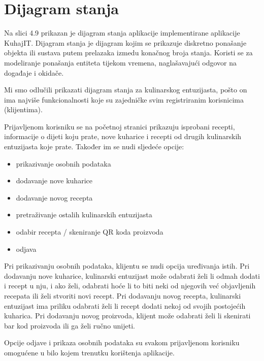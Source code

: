 		\eject
		
		
		\section{Dijagram stanja}
		
		Na slici 4.9 prikazan je dijagram stanja aplikacije implementirane aplikacije KuhajIT. Dijagram stanja je dijagram kojim se prikazuje diskretno ponašanje objekta ili sustava putem prelazaka izmedu konačnog broja stanja. Koristi se za modeliranje ponašanja entiteta tijekom vremena, naglašavajući odgovor na događaje i okidače.
		
		Mi smo odlučili prikazati dijagram stanja za kulinarskog entuzijasta, pošto on ima najviše funkcionalnosti koje su zajedničke svim registriranim korisnicima (klijentima).
		
  Prijavljenom korisniku se na početnoj stranici prikazuju isprobani recepti, informacije o dijeti koju prate, nove kuharice i recepti od drugih kulinarskih entuzijasta koje prate. Također im se nudi sljedeće opcije:
  \begin{itemize}
			\item prikazivanje osobnih podataka
			\item dodavanje nove kuharice
			\item dodavanje novog recepta 
			\item pretraživanje ostalih kulinarskih entuzijasta
			\item odabir recepta / skeniranje QR koda proizvoda
			\item odjava
		\end{itemize}
		
Pri prikazivanju osobnih podataka, klijentu se nudi opcija uređivanja istih. 
Pri dodavanju nove kuharice, kulinarski entuzijast može odabrati želi li odmah dodati i recept u nju, i ako želi, odabrati hoće li to biti neki od njegovih već objavljenih recepata ili želi stvoriti novi recept.
Pri dodavanju novog recepta, kulinarski entuzijast ima priliku odabrati želi li recept dodati nekoj od svojih postojećih kuharica.
Pri dodavanju novog proizvoda, klijent može odabrati želi li skenirati bar kod proizvoda ili ga želi ručno unijeti.

Opcije odjave i prikaza osobnih podataka su svakom prijavljenom korisniku omogućene u bilo kojem trenutku korištenja aplikacije.

